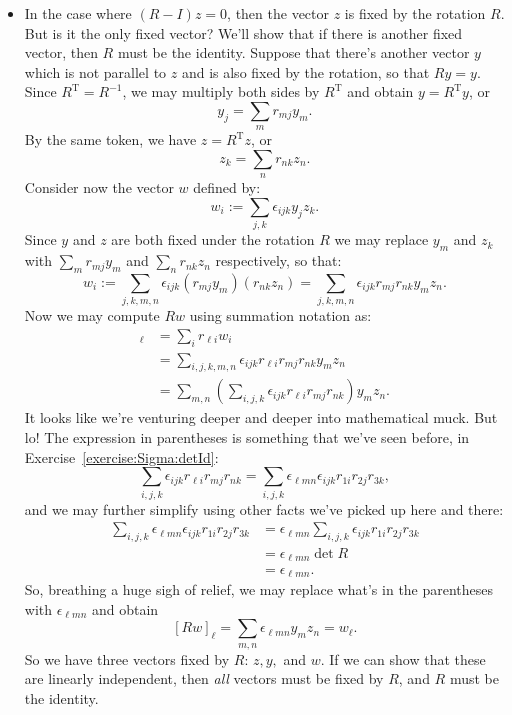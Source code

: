 \begin{itemize}
\item
In the case where $(R-I)z = 0$, then the vector $z$ is fixed by the rotation $R$. But is it the only fixed vector?  We'll show that if there is another fixed vector, then $R$ must be the identity.  Suppose that there's another vector $y$ which is not parallel to $z$ and is also fixed by the rotation, so that $Ry=y$. Since $R^{\text{T}}=R^{-1}$, we may multiply both sides by $R^{\text{T}}$ and obtain $y = R^{\text{T}}y$, or
\[ y_j = \sum_m r_{mj} y_m .\]
By the same token, we have $z = R^{\text{T}}z$, or
\[ z_k = \sum_n r_{nk} z_n .\]
Consider now the vector $w$ defined by:  
\[ w_i := \sum_{j,k}\epsilon_{ijk}y_jz_k. \]  
Since $y$ and $z$ are both fixed under the rotation $R$ we may replace $y_m$ and $z_k$ with $ \sum_m r_{mj} y_m$ and $\sum_n r_{nk} z_n$ respectively, so that:
\[ w_i := \sum_{j,k,m,n}\epsilon_{ijk}(r_{mj} y_m) (r_{nk} z_n) = \sum_{j,k,m,n}\epsilon_{ijk}r_{mj}r_{nk} y_m  z_n. \]  
Now we may compute $Rw$  using summation notation as:
\begin{align*}
[Rw]_{\ell} &= \sum_i r_{\ell i} w_i  \\
&= \sum_{i,j,k,m,n}\epsilon_{ijk}r_{\ell i}r_{mj}r_{nk} y_m  z_n \\
&= \sum_{m,n} \left( \sum_{i,j,k}\epsilon_{ijk}r_{\ell i}r_{mj}r_{nk} \right) y_m  z_n.
\end{align*}
It looks like we're venturing deeper and deeper into mathematical muck. But lo! The expression in parentheses is something that we've seen  before, in Exercise~\ref{exercise:Sigma:detId}:
\[ \sum_{i,j,k}\epsilon_{ijk}r_{\ell i}r_{mj}r_{nk}= \sum_{i,j,k} \epsilon_{\ell m n} \epsilon_{ijk}r_{1 i}r_{2j}r_{3k},\]
and we may further simplify using other facts we've picked up here and there:
\begin{align*}
 \sum_{i,j,k} \epsilon_{\ell m n} \epsilon_{ijk}r_{1 i}r_{2j}r_{3k}
&= \epsilon_{\ell m n} \sum_{i,j,k}  \epsilon_{ijk}r_{1 i}r_{2j}r_{3k}\\
&= \epsilon_{\ell m n} \det{R}\\
&= \epsilon_{\ell m n}.
\end{align*}
So, breathing a huge sigh of relief, we may replace what's in the parentheses with  $\epsilon_{\ell m n}$ and 
obtain
\[
[Rw]_{\ell} = \sum_{m,n} \epsilon_{\ell mn} y_m  z_n = w_{\ell}.
\]
So we have three vectors fixed by $R$:  $z,y,$ and $w$.  If we can show that these are linearly independent, then \emph{all} vectors must be fixed by $R$, and $R$ must be the identity. 


\end{itemize}
